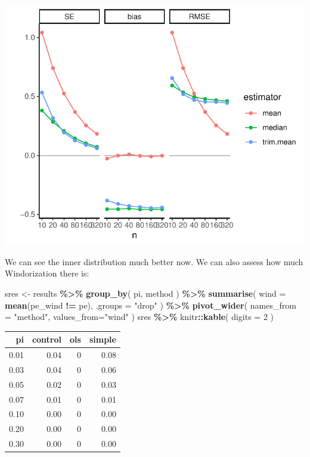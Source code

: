 \documentclass[
]{book}
\newenvironment{Shaded}{\begin{snugshade}}{\end{snugshade}}
\newcommand{\AttributeTok}[1]{\textcolor[rgb]{0.13,0.29,0.53}{#1}}
\newcommand{\DecValTok}[1]{\textcolor[rgb]{0.00,0.00,0.81}{#1}}
\newcommand{\FunctionTok}[1]{\textcolor[rgb]{0.13,0.29,0.53}{\textbf{#1}}}
\newcommand{\NormalTok}[1]{#1}
\newcommand{\OtherTok}[1]{\textcolor[rgb]{0.56,0.35,0.01}{#1}}
\newcommand{\SpecialCharTok}[1]{\textcolor[rgb]{0.81,0.36,0.00}{\textbf{#1}}}
\newcommand{\StringTok}[1]{\textcolor[rgb]{0.31,0.60,0.02}{#1}}
\begin{document}
\begin{center}\includegraphics[width=0.75\linewidth]{Designing-Simulations-in-R_files/figure-latex/unnamed-chunk-178-1} \end{center}

We can see the inner distribution much better now.
We can also assess how much Windorization there is:

\begin{Shaded}
\begin{Highlighting}[]
\NormalTok{sres }\OtherTok{\textless{}{-}}\NormalTok{ results }\SpecialCharTok{\%\textgreater{}\%}
  \FunctionTok{group\_by}\NormalTok{( pi, method ) }\SpecialCharTok{\%\textgreater{}\%}
  \FunctionTok{summarise}\NormalTok{( }
    \AttributeTok{wind =} \FunctionTok{mean}\NormalTok{(pe\_wind }\SpecialCharTok{!=}\NormalTok{ pe), }\AttributeTok{.groups =} \StringTok{"drop"}
\NormalTok{  ) }\SpecialCharTok{\%\textgreater{}\%}
  \FunctionTok{pivot\_wider}\NormalTok{( }\AttributeTok{names\_from =} \StringTok{"method"}\NormalTok{,}
               \AttributeTok{values\_from=}\StringTok{"wind"}\NormalTok{ )}
\NormalTok{sres }\SpecialCharTok{\%\textgreater{}\%}
\NormalTok{  knitr}\SpecialCharTok{::}\FunctionTok{kable}\NormalTok{( }\AttributeTok{digits =} \DecValTok{2}\NormalTok{ )}
\end{Highlighting}
\end{Shaded}

\begin{tabular}{r|r|r|r}
\hline
pi & control & ols & simple\\
\hline
0.01 & 0.04 & 0 & 0.08\\
\hline
0.03 & 0.04 & 0 & 0.06\\
\hline
0.05 & 0.02 & 0 & 0.03\\
\hline
0.07 & 0.01 & 0 & 0.01\\
\hline
0.10 & 0.00 & 0 & 0.00\\
\hline
0.20 & 0.00 & 0 & 0.00\\
\hline
0.30 & 0.00 & 0 & 0.00\\
\hline
\end{tabular}
\end{document}
